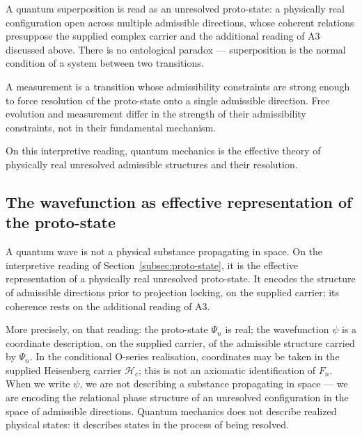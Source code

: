\documentclass[11pt,a4paper]{article}
\begin{document}
    A quantum superposition is read as an unresolved proto-state: a physically real
    configuration open across multiple admissible directions, whose coherent relations presuppose the
    supplied complex carrier and the additional reading of A3 discussed above.
    There is no ontological paradox — superposition is the normal condition of
    a system between two transitions.

    A measurement is a transition whose admissibility constraints are strong enough
    to force resolution of the proto-state onto a single admissible direction.
    Free evolution and measurement differ in the strength of their admissibility
    constraints, not in their fundamental mechanism.

    On this interpretive reading, quantum mechanics is the effective theory of physically real
    unresolved admissible structures and their resolution.

  \subsection{The wavefunction as effective representation of the proto-state}
    \label{subsec:wavefunction}

    A quantum wave is not a physical substance propagating in space.
    On the interpretive reading of Section~\ref{subsec:proto-state}, it is the effective representation of
    a physically real unresolved proto-state.
    It encodes the structure of admissible directions prior to projection locking, on the supplied carrier;
    its coherence rests on the additional reading of A3.

    More precisely, on that reading: the proto-state $\Psi_n$ is real;
    the wavefunction $\psi$ is a coordinate description, on the supplied carrier, of the admissible
    structure carried by $\Psi_n$.
    In the conditional O-series realisation, coordinates may be taken in the
    supplied Heisenberg carrier $\mathcal{H}_c$; this is not an axiomatic
    identification of $F_n$.
    When we write $\psi$, we are not describing a substance propagating in space
    — we are encoding the relational phase structure of an unresolved
    configuration in the space of admissible directions.
    Quantum mechanics does not describe realized physical states:
    it describes states in the process of being resolved.
\end{document}

